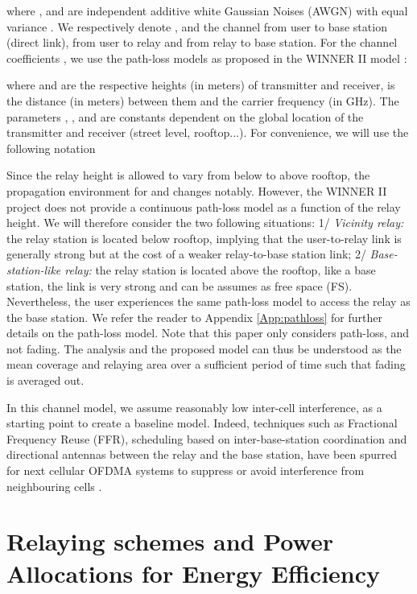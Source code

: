 \documentclass[journal]{IEEEtran}
\theoremstyle{definition}
\begin{document}
where ,  and  are independent additive white Gaussian Noises (AWGN) with equal variance . We respectively denote ,  and  the channel from user to base station (direct link), from user to relay and from relay to base station.  For the channel coefficients , we use the path-loss models as proposed in the WINNER II model \cite{winner}: 

where  and  are the respective heights (in meters) of transmitter and receiver,  is the distance (in meters) between them and  the carrier frequency (in GHz). The parameters , ,  and  are constants dependent on the global location of the transmitter and receiver (street level, rooftop...).
For convenience, we will use the following notation


Since the relay height is allowed to vary from below to above rooftop, the propagation environment for  and  changes notably. However, the WINNER II project does not provide a continuous path-loss model as a function of the relay height. We will therefore consider the two following situations: 
1/ \textit{Vicinity relay:} the relay station is located below rooftop, implying that the user-to-relay link is generally strong but at the cost of a weaker relay-to-base station link; 
2/ \textit{Base-station-like relay:} the relay station is located above the rooftop, like a base station, the  link is very strong and can be assumes as free space (FS). Nevertheless, the user experiences the same path-loss model to access the relay as the base station.
We refer the reader to Appendix \ref{App:pathloss} for further details on the path-loss model. Note that this paper only considers path-loss, and not fading. The analysis and the proposed model can thus be understood as the mean coverage and relaying area over a sufficient period of time such that fading is averaged out.


In this channel model, we assume reasonably low inter-cell interference, as a starting point to create a baseline model. Indeed, techniques such as Fractional Frequency Reuse (FFR), scheduling based on inter-base-station coordination and directional antennas between the relay and the base station, have been spurred for next cellular OFDMA systems to suppress or avoid interference from neighbouring cells \cite{book_LTE_Fund}.






\section{Relaying schemes and Power Allocations for Energy Efficiency}
\label{sec:schemes}
\end{document}
